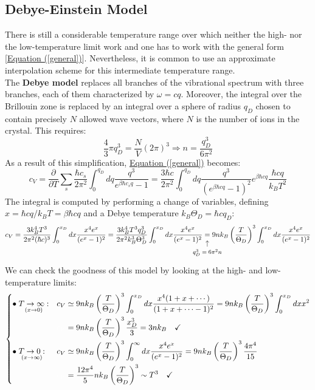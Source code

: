 \documentclass[10.75pt,a4paper,openright,bottom=2cm]{article}
\begin{document}
\subsection{Debye-Einstein Model}
There is still a considerable temperature range over which neither the high- nor the low-temperature limit work and one has to work with the general form [\hyperref[general]{Equation (\ref{general})}]. Nevertheless, it is common to use an approximate interpolation scheme for this intermediate temperature range.\\
The \textbf{Debye model} replaces all branches of the vibrational spectrum with three branches, each of them characterized by $\omega=cq$. Moreover, the integral over the  Brillouin zone is replaced by an integral over a sphere of radius $q_D$ chosen to contain precisely $N$ allowed wave vectors, where $N$ is the number of ions in the crystal. This requires:
\[
\frac{4}{3}\pi q_D^3=\frac{N}{V}(2\pi)^3\Rightarrow n=\frac{q_D^3}{6\pi^2}
\]
As a result of this simplification, \hyperref[general]{Equation (\ref{general})} becomes:
\[
c_V=\frac{\partial}{\partial T}\sum_s\frac{\hbar c_s}{2\pi^2}\int_0^{q_D}dq\frac{q^3}{e^{\beta\hbar c_sq}-1}=\frac{3\hbar c}{2\pi^2}\int_0^{q_D}dq\frac{q^3}{(e^{\beta\hbar cq}-1)^2}e^{\beta\hbar cq}\frac{\hbar cq}{k_BT^2}
\]
The integral is computed by performing a change of variables, defining $x=\hbar cq/k_BT=\beta\hbar cq$ and a Debye temperature $k_B\Theta_D=\hbar cq_D$:
\[
c_V=\frac{3k_B^4T^3}{2\pi^2(\hbar c)^3}\int_0^{x_D}dx\frac{x^4e^x}{(e^x-1)^2}=\frac{3k_B^4T^3q_D^3}{2\pi^2k_B^3\Theta_D^3}\int_0^{x_D}dx\frac{x^4e^x}{(e^x-1)^2}\underset{\mathclap{\tikz \node {$\uparrow$} node [below=1ex] {\footnotesize $q_D^3=6\pi^2n$};}}{=}9nk_B\left(\frac{T}{\Theta_D}\right)^3\int_0^{x_D}dx\frac{x^4e^x}{(e^x-1)^2}
\]
We can check the goodness of this model by looking at the high- and low-temperature limits:
\[
\left\{
\begin{aligned}
&\bullet\underset{(x\to0)}{T\to\infty:}&&c_V\simeq9nk_B\left(\frac{T}{\Theta_D}\right)^3\int_0^{x_D}dx\frac{x^4(1+x+\cdots)}{(1+x+\cdots-1)^2}=9nk_B\left(\frac{T}{\Theta_D}\right)^3\int_0^{x_D}dxx^2\\
& &&{\color{white}{c_V}}=9nk_B\left(\frac{T}{\Theta_D}\right)^3\frac{x_D^3}{3}=3nk_B \quad \checkmark\\
&\bullet\underset{(x\to\infty)}{T\to0:}&&c_V\simeq9nk_B\left(\frac{T}{\Theta_D}\right)^3\int_0^\infty dx\frac{x^4e^x}{(e^x-1)^2}=9nk_B\left(\frac{T}{\Theta_D}\right)^3\frac{4\pi^4}{15}\\
& &&{\color{white}{c_V}}=\frac{12\pi^4}{5}nk_B\left(\frac{T}{\Theta_D}\right)^3\sim T^3 \quad \checkmark
\end{aligned}
\right.
\]
\end{document}
